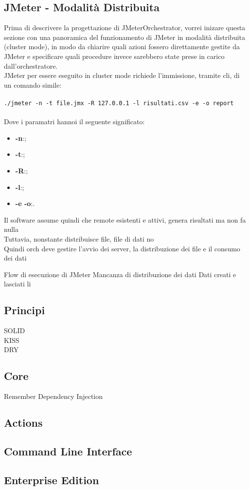 \subsection{JMeter - Modalità Distribuita}
Prima di descrivere la progettazione di JMeterOrchestrator, vorrei inizare questa sezione con una panoramica del funzionamento di JMeter in modalità distribuita (cluster mode), in modo da chiarire quali azioni fossero direttamente gestite da JMeter e specificare quali procedure invece sarebbero state prese in carico dall'orchestratore. \\
JMeter per essere eseguito in cluster mode richiede l'immissione, tramite \gls{cli}, di un comando simile:\\\\
\texttt{./jmeter -n -t file.jmx -R 127.0.0.1 -l risultati.csv -e -o report}\\\\
Dove i paramatri hannoi il seguente significato:
\begin{itemize}
	\item \textbf{-n}:;
	\item \textbf{-t}:;
	\item \textbf{-R}:;
	\item \textbf{-l}:;
	\item \textbf{-e -o}:.
\end{itemize}
Il software assume quindi che remote esistenti e attivi, genera risultati ma non fa nulla \\
Tuttavia, nonstante distribuisce file, file di dati no \\
Quindi orch deve gestire l'avvio dei server, la distribuzione dei file e il consumo dei dati


Flow di esecuzione di JMeter
Mancanza di distribuzione dei dati
Dati creati e lasciati li
\subsection{Principi}
SOLID\\
KISS\\
DRY
\subsection{Core}
Remember Dependency Injection
\subsection{Actions}
\subsection{Command Line Interface}
\subsection{Enterprise Edition}